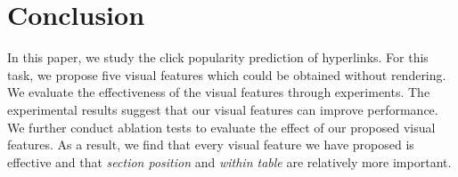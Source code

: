 \section{Conclusion}

In this paper, we study the click popularity prediction of hyperlinks. For this task, we propose five visual features which could be obtained without rendering. We evaluate the effectiveness of the visual features through experiments. The experimental results suggest that our visual features can improve performance. We further conduct ablation tests to evaluate the effect of our proposed visual features. As a result, we find that every visual feature we have proposed is effective and that \emph{section position} and \emph{within table} are relatively more important.